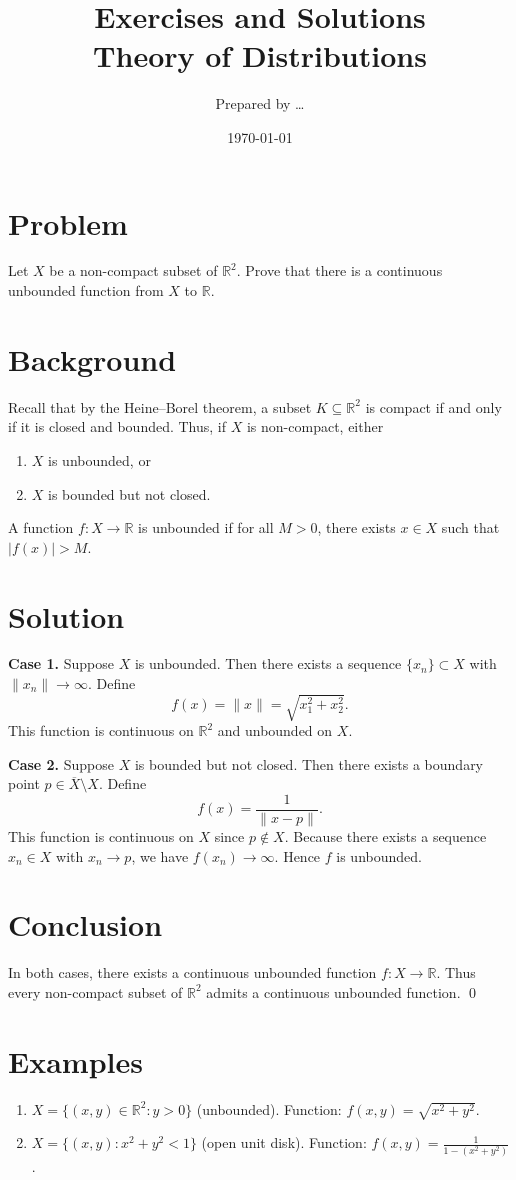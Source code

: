 \documentclass[11pt,a4paper]{article}
\title{Exercises and Solutions \\[0.5em]
	\large Theory of Distributions}
\author{Prepared by \dots}
\date{\today}
\theoremstyle{definition}
\theoremstyle{definition}
\theoremstyle{plain}
\theoremstyle{remark}
\begin{document}
	\maketitle
	
\section*{Problem}
Let $X$ be a non-compact subset of $\mathbb{R}^2$. Prove that there is a continuous unbounded function from $X$ to $\mathbb{R}$.

\section*{Background}
Recall that by the Heine--Borel theorem, a subset $K \subseteq \mathbb{R}^2$ is compact if and only if it is closed and bounded. Thus, if $X$ is non-compact, either
\begin{enumerate}
	\item $X$ is unbounded, or
	\item $X$ is bounded but not closed.
\end{enumerate}
A function $f:X\to \mathbb{R}$ is unbounded if for all $M>0$, there exists $x \in X$ such that $|f(x)|>M$.

\section*{Solution}
\textbf{Case 1.} Suppose $X$ is unbounded. Then there exists a sequence $\{x_n\} \subset X$ with $\|x_n\|\to\infty$. Define
\[
f(x) = \|x\| = \sqrt{x_1^2+x_2^2}.
\]
This function is continuous on $\mathbb{R}^2$ and unbounded on $X$.

\medskip

\textbf{Case 2.} Suppose $X$ is bounded but not closed. Then there exists a boundary point $p \in \overline{X}\setminus X$. Define
\[
f(x) = \frac{1}{\|x-p\|}.
\]
This function is continuous on $X$ since $p\notin X$. Because there exists a sequence $x_n\in X$ with $x_n \to p$, we have $f(x_n)\to \infty$. Hence $f$ is unbounded.

\section*{Conclusion}
In both cases, there exists a continuous unbounded function $f:X\to \mathbb{R}$. Thus every non-compact subset of $\mathbb{R}^2$ admits a continuous unbounded function. \qed

\section*{Examples}
\begin{enumerate}
	\item $X = \{(x,y)\in \mathbb{R}^2 : y>0\}$ (unbounded).  
	Function: $f(x,y)=\sqrt{x^2+y^2}$.
	\item $X = \{(x,y):x^2+y^2<1\}$ (open unit disk).  
	Function: $f(x,y)=\frac{1}{1-(x^2+y^2)}$.
\end{enumerate}
\end{document}
